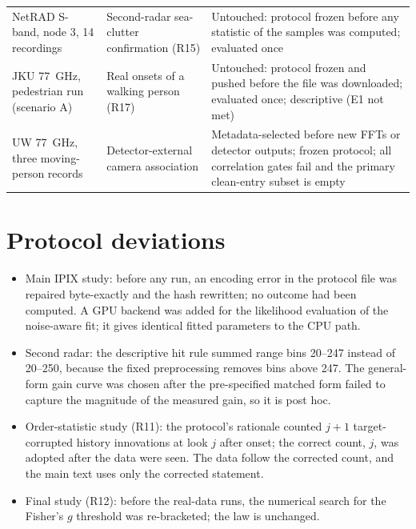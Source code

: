 \documentclass[10pt]{article}
\begin{document}
\begin{table}[h]
\begin{tabular}{p{4.3cm}p{5.2cm}p{6.2cm}}
NetRAD S-band, node 3, 14 recordings & Second-radar sea-clutter confirmation (R15) & Untouched: protocol frozen before any statistic of the samples was computed; evaluated once\\
JKU 77~GHz, pedestrian run (scenario A) & Real onsets of a walking person (R17) & Untouched: protocol frozen and pushed before the file was downloaded; evaluated once; descriptive (E1 not met)\\
UW 77~GHz, three moving-person records & Detector-external camera association & Metadata-selected before new FFTs or detector outputs; frozen protocol; all correlation gates fail and the primary clean-entry subset is empty\\
\bottomrule
\end{tabular}
\end{table}

\section{Protocol deviations}\label{sup:deviations}
\begin{itemize}
\item Main IPIX study: before any run, an encoding error in the protocol file was repaired byte-exactly and the hash rewritten; no outcome had been computed. A GPU backend was added for the likelihood evaluation of the noise-aware fit; it gives identical fitted parameters to the CPU path.
\item Second radar: the descriptive hit rule summed range bins 20--247 instead of 20--250, because the fixed preprocessing removes bins above 247. The general-form gain curve was chosen after the pre-specified matched form failed to capture the magnitude of the measured gain, so it is post hoc.
\item Order-statistic study (R11): the protocol's rationale counted $j+1$ target-corrupted history innovations at look $j$ after onset; the correct count, $j$, was adopted after the data were seen. The data follow the corrected count, and the main text uses only the corrected statement.
\item Final study (R12): before the real-data runs, the numerical search for the Fisher's $g$ threshold was re-bracketed; the law is unchanged.
\end{itemize}
\end{document}
